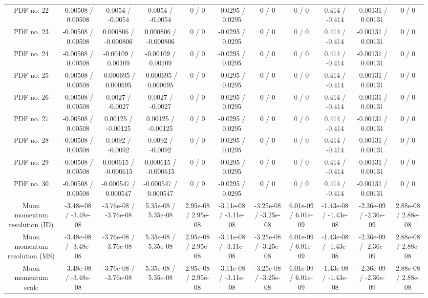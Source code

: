 \begin{table}[htbp]
\begin{center}
\begin{tabular}{|c|c|c|c|c|c|c|c|c|c|c|}
  PDF no. 22 & -0.00508 / 0.00508 & 0.0054 / -0.0054 & 0.0054 / -0.0054 & 0 / 0 & -0.0295 / 0.0295 & 0 / 0 & 0 / 0 & 0.414 / -0.414 & -0.00131 / 0.00131 & 0 / 0 \\ 
  PDF no. 23 & -0.00508 / 0.00508 & 0.000806 / -0.000806 & 0.000806 / -0.000806 & 0 / 0 & -0.0295 / 0.0295 & 0 / 0 & 0 / 0 & 0.414 / -0.414 & -0.00131 / 0.00131 & 0 / 0 \\ 
  PDF no. 24 & -0.00508 / 0.00508 & -0.00109 / 0.00109 & -0.00109 / 0.00109 & 0 / 0 & -0.0295 / 0.0295 & 0 / 0 & 0 / 0 & 0.414 / -0.414 & -0.00131 / 0.00131 & 0 / 0 \\ 
  PDF no. 25 & -0.00508 / 0.00508 & -0.000695 / 0.000695 & -0.000695 / 0.000695 & 0 / 0 & -0.0295 / 0.0295 & 0 / 0 & 0 / 0 & 0.414 / -0.414 & -0.00131 / 0.00131 & 0 / 0 \\ 
  PDF no. 26 & -0.00508 / 0.00508 & 0.0027 / -0.0027 & 0.0027 / -0.0027 & 0 / 0 & -0.0295 / 0.0295 & 0 / 0 & 0 / 0 & 0.414 / -0.414 & -0.00131 / 0.00131 & 0 / 0 \\ 
  PDF no. 27 & -0.00508 / 0.00508 & 0.00125 / -0.00125 & 0.00125 / -0.00125 & 0 / 0 & -0.0295 / 0.0295 & 0 / 0 & 0 / 0 & 0.414 / -0.414 & -0.00131 / 0.00131 & 0 / 0 \\ 
  PDF no. 28 & -0.00508 / 0.00508 & 0.0092 / -0.0092 & 0.0092 / -0.0092 & 0 / 0 & -0.0295 / 0.0295 & 0 / 0 & 0 / 0 & 0.414 / -0.414 & -0.00131 / 0.00131 & 0 / 0 \\ 
  PDF no. 29 & -0.00508 / 0.00508 & 0.000615 / -0.000615 & 0.000615 / -0.000615 & 0 / 0 & -0.0295 / 0.0295 & 0 / 0 & 0 / 0 & 0.414 / -0.414 & -0.00131 / 0.00131 & 0 / 0 \\ 
  PDF no. 30 & -0.00508 / 0.00508 & -0.000547 / 0.000547 & -0.000547 / 0.000547 & 0 / 0 & -0.0295 / 0.0295 & 0 / 0 & 0 / 0 & 0.414 / -0.414 & -0.00131 / 0.00131 & 0 / 0 \\ 
  Muon momentum resolution (ID) & -3.48e-08 / -3.48e-08 & -3.76e-08 / -3.76e-08 & 5.35e-08 / 5.35e-08 & 2.95e-08 / 2.95e-08 & -3.11e-08 / -3.11e-08 & -3.25e-08 / -3.25e-08 & 6.01e-09 / 6.01e-09 & -1.43e-08 / -1.43e-08 & -2.36e-09 / -2.36e-09 & 2.88e-08 / 2.88e-08 \\ 
  Muon momentum resolution (MS) & -3.48e-08 / -3.48e-08 & -3.76e-08 / -3.76e-08 & 5.35e-08 / 5.35e-08 & 2.95e-08 / 2.95e-08 & -3.11e-08 / -3.11e-08 & -3.25e-08 / -3.25e-08 & 6.01e-09 / 6.01e-09 & -1.43e-08 / -1.43e-08 & -2.36e-09 / -2.36e-09 & 2.88e-08 / 2.88e-08 \\ 
  Muon momentum scale & -3.48e-08 / -3.48e-08 & -3.76e-08 / -3.76e-08 & 5.35e-08 / 5.35e-08 & 2.95e-08 / 2.95e-08 & -3.11e-08 / -3.11e-08 & -3.25e-08 / -3.25e-08 & 6.01e-09 / 6.01e-09 & -1.43e-08 / -1.43e-08 & -2.36e-09 / -2.36e-09 & 2.88e-08 / 2.88e-08 \\ 

\end{tabular}
\end{center}
\end{table}
